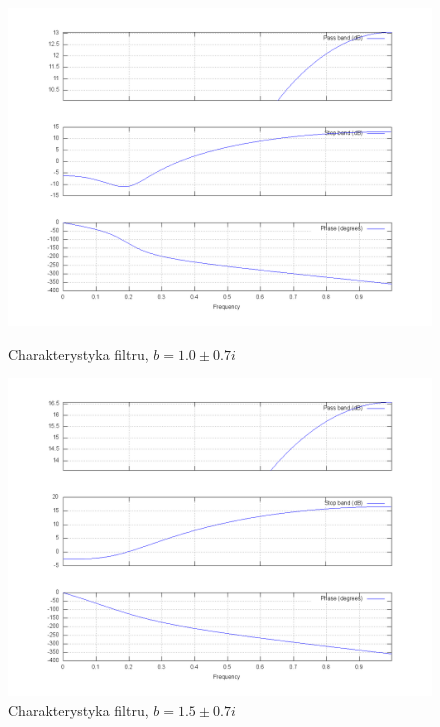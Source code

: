 \documentclass[wide,a4paper,titlepage,12pt]{mwart}
\begin{document}
  \begin{figure}[htbp]
    \begin{center}
      \includegraphics[scale=.3]{out/fig27.png}
      \caption{\label{fig27} Charakterystyka filtru, $b=1.0\pm0.7i$}
      \includegraphics[scale=.3]{out/fig28.png}
      \caption{\label{fig28} Charakterystyka filtru, $b=1.5\pm0.7i$}

    \end{center}
  \end{figure}
\end{document}
